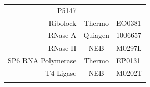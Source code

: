 \documentclass[11pt,singlespacinge,twoside]{reedthesis} %
\theoremstyle{definition}
\theoremstyle{definition}
\theoremstyle{definition}
\theoremstyle{remark}
\begin{document}
\begin{longtable}[]{@{}rcl@{}}
\begin{minipage}[t]{0.29\columnwidth}
P5147\strut
\end{minipage}\tabularnewline
\begin{minipage}[t]{0.29\columnwidth}\raggedleft
Ribolock\strut
\end{minipage} & \begin{minipage}[t]{0.33\columnwidth}\centering
Thermo\strut
\end{minipage} & \begin{minipage}[t]{0.29\columnwidth}\raggedright
EO0381\strut
\end{minipage}\tabularnewline
\begin{minipage}[t]{0.29\columnwidth}\raggedleft
RNase A\strut
\end{minipage} & \begin{minipage}[t]{0.33\columnwidth}\centering
Quiagen\strut
\end{minipage} & \begin{minipage}[t]{0.29\columnwidth}\raggedright
1006657\strut
\end{minipage}\tabularnewline
\begin{minipage}[t]{0.29\columnwidth}\raggedleft
RNase H\strut
\end{minipage} & \begin{minipage}[t]{0.33\columnwidth}\centering
NEB\strut
\end{minipage} & \begin{minipage}[t]{0.29\columnwidth}\raggedright
M0297L\strut
\end{minipage}\tabularnewline
\begin{minipage}[t]{0.29\columnwidth}\raggedleft
SP6 RNA Polymerase\strut
\end{minipage} & \begin{minipage}[t]{0.33\columnwidth}\centering
Thermo\strut
\end{minipage} & \begin{minipage}[t]{0.29\columnwidth}\raggedright
EP0131\strut
\end{minipage}\tabularnewline
\begin{minipage}[t]{0.29\columnwidth}\raggedleft
T4 Ligase\strut
\end{minipage} & \begin{minipage}[t]{0.33\columnwidth}\centering
NEB\strut
\end{minipage} & \begin{minipage}[t]{0.29\columnwidth}\raggedright
M0202T\strut
\end{minipage}\tabularnewline
\begin{minipage}[t]{0.29\columnwidth}\raggedleft

\end{minipage}
\end{longtable}
\end{document}
